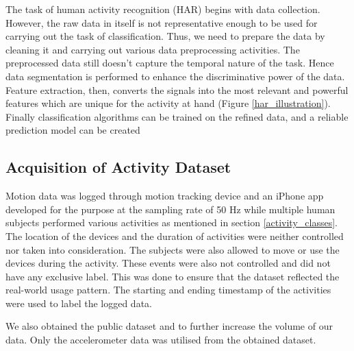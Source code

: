 \documentclass[5p]{elsarticle}
\begin{document}
The task of human activity recognition (HAR) begins with data collection. However, the raw data in itself is not representative enough to be used for carrying out the task of classification. Thus, we need to prepare the data by cleaning it and carrying out various data preprocessing activities. The preprocessed data still doesn’t capture the temporal nature of the task. Hence data segmentation is performed to enhance the discriminative power of the data. Feature extraction, then, converts the signals into the most relevant and powerful features which are unique for the activity at hand (Figure \ref{har_illustration}). Finally classification algorithms can be trained on the refined data, and a reliable prediction model can be created

\subsection{Acquisition of Activity Dataset}
Motion data was logged through motion tracking device and an iPhone app developed for the purpose at the sampling rate of 50 Hz while multiple human subjects performed various activities as mentioned in section \ref{activity_classes}. The location of the devices and the duration of activities were neither controlled nor taken into consideration. The subjects were also allowed to move or use the devices during the activity. These events were also not controlled and did not have any exclusive label. This was done to ensure that the dataset reflected the real-world usage pattern. The starting and ending timestamp of the activities were used to label the logged data.

We also obtained the public dataset \cite{Reyes-Ortiz2015} and \cite{Shoaib2014} to further increase the volume of our data. Only the accelerometer data was utilised from the obtained dataset.
\end{document}
